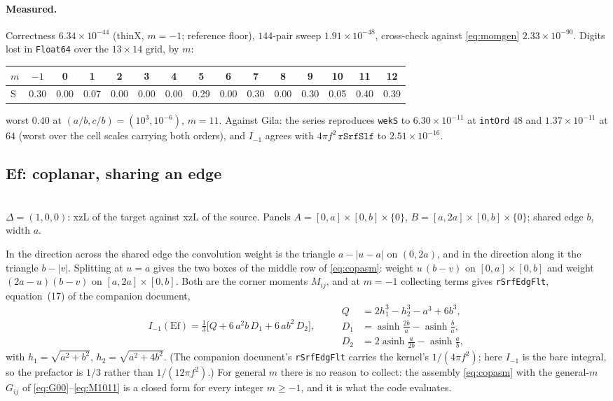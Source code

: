 \documentclass[11pt]{article}
\theoremstyle{remark}
\newcommand{\asinh}{\operatorname{asinh}}
\newcommand{\code}[1]{\texttt{#1}}
\newcommand{\geofig}[2]{\begin{center}#1\\[2pt]{\footnotesize #2}\end{center}}
\begin{document}
\paragraph{Measured.} Correctness $6.34\times10^{-44}$ (thinX, $m=-1$; reference floor),
$144$-pair sweep $1.91\times10^{-48}$, cross-check against \eqref{eq:momgen}
$2.33\times10^{-90}$. Digits lost in \code{Float64} over the $13\times14$ grid, by $m$:

\begin{center}\small
\begin{tabular}{@{}lcccccccccccccc@{}}
\toprule
$m$ & $-1$ & 0 & 1 & 2 & 3 & 4 & 5 & 6 & 7 & 8 & 9 & 10 & 11 & 12\\
\midrule
S & 0.30 & 0.00 & 0.07 & 0.00 & 0.00 & 0.00 & 0.29 & 0.00 & 0.30 & 0.00 & 0.30 & 0.05 & 0.40 & 0.39\\
\bottomrule
\end{tabular}
\end{center}
\noindent
worst $0.40$ at $(a/b, c/b) = (10^{3}, 10^{-6})$, $m = 11$. Against Gila: the series
reproduces \code{wekS} to $6.30\times10^{-11}$ at \code{intOrd} $48$ and
$1.37\times10^{-11}$ at $64$ (worst over the cell scales carrying both orders), and
$I_{-1}$ agrees with $4\pi f^2\,\code{rSrfSlf}$ to $2.51\times10^{-16}$.

\subsection{Ef: coplanar, sharing an edge}
\label{sec:Ef}

\geofig{\figEf}{$\Delta = (1,0,0)$: xzL of the target against xzL of the source. Panels
$A = [0,a]\times[0,b]\times\{0\}$, $B = [a,2a]\times[0,b]\times\{0\}$; shared edge $b$,
width $a$.}

In the direction across the shared edge the convolution weight is the triangle
$a - |u - a|$ on $(0,2a)$, and in the direction along it the triangle $b - |v|$. Splitting
at $u = a$ gives the two boxes of the middle row of \eqref{eq:copasm}: weight $u\,(b-v)$
on $[0,a]\times[0,b]$ and weight $(2a-u)(b-v)$ on $[a,2a]\times[0,b]$. Both are the
corner moments $M_{ij}$, and at $m = -1$ collecting terms gives \code{rSrfEdgFlt},
equation~(17) of the companion document,
\begin{equation}
\boxed{\;
I_{-1}(\text{Ef}) = \tfrac{1}{3}\bigl[Q + 6\,a^2 b\,D_1 + 6\,a b^2\,D_2\bigr],\;}
\qquad
\begin{aligned}
Q &= 2h_1^3 - h_2^3 - a^3 + 6b^3,\\
D_1 &= \asinh\tfrac{2b}{a} - \asinh\tfrac{b}{a},\\
D_2 &= 2\asinh\tfrac{a}{2b} - \asinh\tfrac{a}{b},
\end{aligned}
\end{equation}
with $h_1 = \sqrt{a^2+b^2}$, $h_2 = \sqrt{a^2+4b^2}$. (The companion document's
\code{rSrfEdgFlt} carries the kernel's $1/(4\pi f^2)$; here $I_{-1}$ is the bare integral,
so the prefactor is $1/3$ rather than $1/(12\pi f^2)$.) For general $m$ there is no reason
to collect: the assembly \eqref{eq:copasm} with the general-$m$ $G_{ij}$ of
\eqref{eq:G00}--\eqref{eq:M1011} is a closed form for every integer $m \ge -1$, and it is
what the code evaluates.
\end{document}
